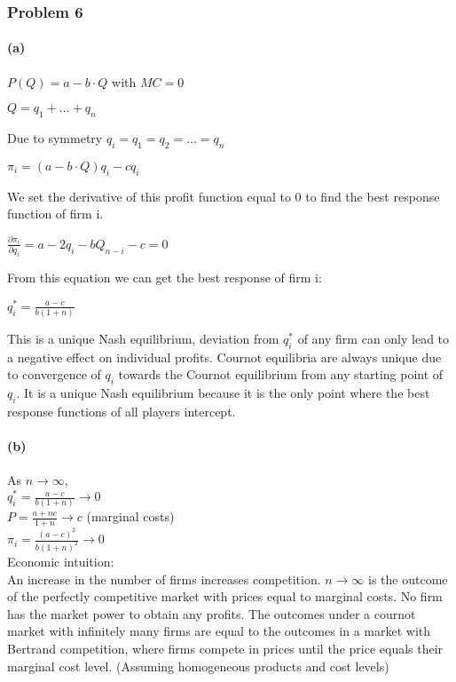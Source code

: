 \documentclass[]{article}
\let\oldparagraph\paragraph
\renewcommand{\paragraph}[1]{\oldparagraph{#1}\mbox{}}
\begin{document}
\subsubsection{Problem 6}\label{problem-6}

\paragraph{(a)}\label{a}

$P(Q)=a-b\cdot Q$ with $MC=0$

$Q=q_1+...+q_n$ 

Due to symmetry $q_i=q_1=q_2=...=q_n$

$\pi_i=(a-b\cdot Q)q_i-cq_i$

We set the derivative of this profit function equal to 0 to find the best response function of firm i.

$\frac{\partial\pi_i}{\partial q_i}=a-2q_i-bQ_{n-i}-c=0$

From this equation we can get the best response of firm i:

$q_i^*=\frac{a-c}{b(1+n)}$

This is a unique Nash equilibrium, deviation from $q_i^*$ of any firm can only lead to a negative effect on individual profits. Cournot equilibria are always unique due to convergence of $q_i$ towards the Cournot equilibrium from any starting point of $q_i$. It is a unique Nash equilibrium because it is the only point where the best response functions of all players intercept.

\paragraph{(b)}

As $n\rightarrow\infty$, \\
$q_i^*=\frac{a-c}{b(1+n)}\rightarrow 0$\\
$P=\frac{a+nc}{1+n}\rightarrow c$    (marginal costs)\\
$\pi_i=\frac{(a-c)^2}{b(1+n)^2}\rightarrow 0$ \\

Economic intuition:\\
An increase in the number of firms increases competition. $n\rightarrow\infty$ is the outcome of the perfectly competitive market with prices equal to marginal costs. No firm has the market power to obtain any profits. 
The outcomes under a cournot market with infinitely many firms are equal to the outcomes in a market with Bertrand competition, where firms compete in prices until the price equals their marginal cost level. (Assuming homogeneous products and cost levels) 
\end{document}
